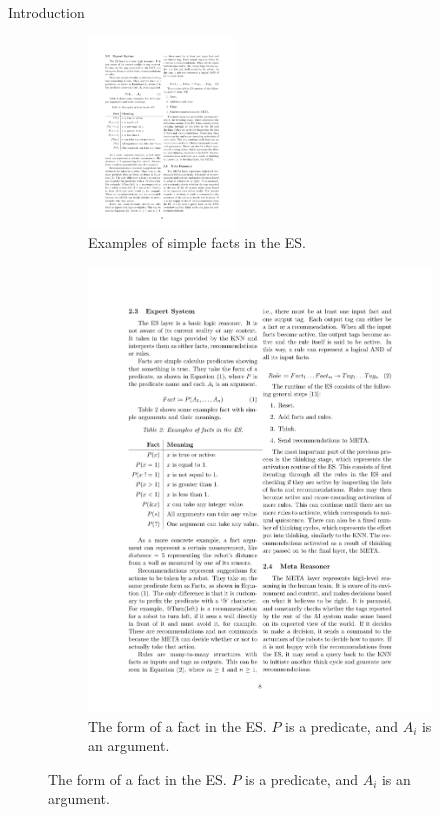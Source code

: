 \documentclass[final]{beamer} %
\begin{document}
\begin{frame}
\begin{columns}
\begin{column}{.33\textwidth}
{\begin{block}{Introduction}
{					\begin{figure}[!htb]
						\centering
						\begin{subfigure}[!htb]{0.4\columnwidth}
							\centering
							\includegraphics[height=2in]{figures/fact_examples.pdf}
							\caption{Examples of simple facts in the ES.}
						\end{subfigure}
						\begin{subfigure}[!htb]{0.58\columnwidth}
							\centering
							\includegraphics[width=0.5\columnwidth]{figures/fact.pdf}
							\caption{The form of a fact in the ES. $P$ is a predicate, and $A_i$ is an argument.}
							
							\vspace{2ex}
							

\end{subfigure}
\end{figure}}
\end{block}}
\end{column}
\end{columns}
\end{frame}
\end{document}
